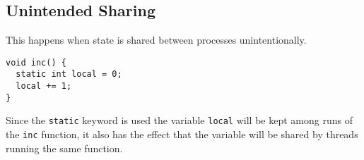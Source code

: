 \subsection{Unintended Sharing}

This happens when state is shared between processes unintentionally.

\begin{lstlisting}[caption={Example of unintended sharing.}]
void inc() {
  static int local = 0;
  local += 1;
}
\end{lstlisting}

Since the \texttt{static} keyword is used the variable \texttt{local} will be kept among runs of the \texttt{inc} function,
it also has the effect that the variable will be shared by threads running the same function.